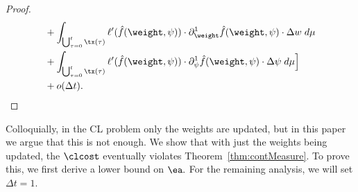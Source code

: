 \begin{proof}
\begin{align*}
        & + \displaystyle\int_{\bigcup_{\tau = 0}^{t}\tx(\tau)} \ell'(\hat{f}(\weight,\psi))\cdot \partial_{\weight}^1 \hat{f}(\weight,\psi)\cdot \Delta w \hspace{1mm} d\mu \\ &+\displaystyle\int_{\bigcup_{\tau = 0}^{t}\tx(\tau)} \ell'(\hat{f}(\weight,\psi))\cdot \partial_\psi^1 \hat{f}(\weight,\psi)\cdot \Delta \psi \hspace{1mm}  d\mu\Big] \\ &+ o(\Delta t).
    \end{align*}
\end{proof}

Colloquially, in the CL problem only the weights are updated, but in this paper we argue that this is not enough. We show that  with just the weights being updated, the $\clcost$ eventually violates Theorem~\ref{thm:contMeasure}. To prove this, we first derive a lower bound on $\ea.$ For the remaining analysis, we will set  $ \Delta t = 1.$

